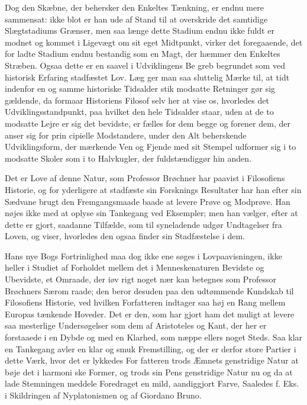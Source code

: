 \documentclass[12pt,a4paper,openany]{book}
\newcommand{\opage}[1]{\marginnote{\footnotesize\textit{[#1]}}}
\begin{document}
\opage{119}Dog den Skæbne, der behersker den Enkeltes Tænkning,
er endnu mere sammensat: ikke blot er han ude af Stand til
at overskride det samtidige Slægtstadiums Grænser, men saa
længe dette Stadium endnu ikke fuldt er modnet og kommet i
Ligevægt om sit eget Midtpunkt, virker det foregaaende, det for\-%
ladte Stadium endnu bestandig som en Magt, der hæmmer den
Enkeltes Stræben. Ogsaa dette er en saavel i Udviklingens Be\-%
greb begrundet som ved historisk Erfaring stadfæstet Lov. Læg\-%
ger man saa sluttelig Mærke til, at tidt indenfor en og samme
historiske Tidsalder stik modsatte Retninger gør sig gældende,
da formaar Historiens Filosof selv her at vise os, hvorledes
det Udviklingsstandpunkt, paa hvilket den hele Tidsalder
staar, uden at de to modsatte Lejre er sig det bevidste, er
fælles for dem begge og forener dem, der anser sig for prin\-%
cipielle Modstandere, under den Alt beherskende Udviklingsform,
der mærkende Ven og Fjende med sit Stempel udformer sig i to
modsatte Skoler som i to Halvkugler, der fuldstændiggør hin\-%
anden.

Det er Love af denne Natur, som Professor Brøchner har
paavist i Filosofiens Historie, og for yderligere at stadfæste sin
Forsknings Resultater har han efter sin Sædvane brugt den
Fremgangsmaade baade at levere Prøve og Modprøve. Han
nøjes ikke med at oplyse sin Tankegang ved Eksempler; men
han vælger, efter at dette er gjort, saadanne Tilfælde, som til\-%
syneladende udgør Undtagelser fra Loven, og viser, hvorledes
den ogsaa finder sin Stadfæstelse i dem.

Hans nye Bogs Fortrinlighed maa dog ikke ene søges i
Lovpaavisningen, ikke heller i Studiet af Forholdet mellem det
i Menneskenaturen Bevidste og Ubevidste, et Omraade, der iøv\-%
rigt noget nær kan betegnes som Professor Brøchners Særom\-%
raade; den beror desuden paa den udtømmende Kundskab til
Filosofiens Historie, ved hvilken Forfatteren indtager saa høj en
Rang mellem Europas tænkende Hoveder. Det er den, som har
gjort ham det muligt at levere saa mesterlige Undersøgelser
som dem af Aristoteles og Kant, der her er forstaaede i en
Dybde og med en Klarhed, som næppe ellers noget Steds. Saa
klar en Tankegang avler en klar og smuk Fremstilling, og der
er derfor store Partier i dette Værk, hvor det er lykkedes For\-%
fatteren trods Æmnets genstridige Natur at bøje det i harmoni\-%
ske Former, og trods sin Pens genstridige Natur nu og da at
\opage{120}lade Stemningen meddele Foredraget en mild, aandiggjort Farve,
Saaledes f. Eks. i Skildringen af Nyplatonismen og af Giordano
Bruno.
\end{document}
